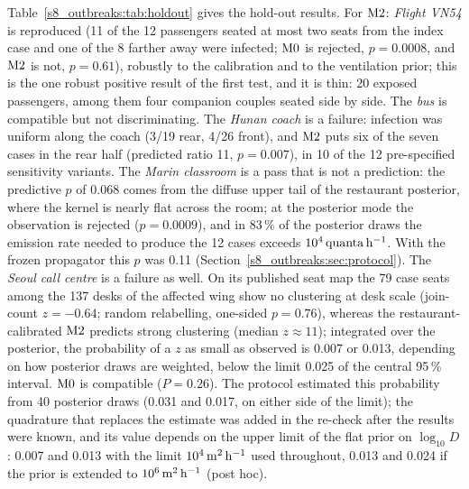 Table~\ref{s8_outbreaks:tab:holdout} gives the hold-out results. For $\mathrm{M2}$: \emph{Flight VN54} is reproduced
(11 of the 12 passengers seated at most two seats from the index case and one of the 8 farther away were
infected; $\mathrm{M0}$ is rejected, $p=0.0008$, and $\mathrm{M2}$ is not, $p=0.61$), robustly to the calibration and to the
ventilation prior; this is the one robust positive result of the first test, and it is thin: 20 exposed
passengers, among them four companion couples seated side by side. The \emph{bus} is compatible but not
discriminating. The \emph{Hunan coach} is a failure: infection was uniform along the coach (3/19 rear, 4/26
front), and $\mathrm{M2}$ puts six of the seven cases in the rear half (predicted ratio 11, $p=0.007$), in 10 of the 12
pre-specified sensitivity variants. The \emph{Marin classroom} is a pass that is not a prediction: the
predictive $p$ of 0.068 comes from the diffuse upper tail of the restaurant posterior, where the kernel is
nearly flat across the room; at the posterior mode the observation is rejected ($p=0.0009$), and in 83\,\% of
the posterior draws the emission rate needed to produce the 12 cases exceeds $10^{4}\,\mathrm{quanta}\,\mathrm{h}^{-1}$. With the frozen
propagator this $p$ was 0.11 (Section~\ref{s8_outbreaks:sec:protocol}).
The \emph{Seoul call centre} is a failure as well. On its published seat map the 79 case seats among the 137
desks of the affected wing show no clustering at desk scale (join-count $z=-0.64$; random relabelling, one-sided
$p=0.76$), whereas the restaurant-calibrated $\mathrm{M2}$ predicts strong clustering (median $z\approx11$); integrated
over the posterior, the probability of a $z$ as small as observed is 0.007 or 0.013, depending on how posterior
draws are weighted, below the limit 0.025 of the central 95\,\% interval. $\mathrm{M0}$ is compatible ($P=0.26$).
The protocol estimated this probability from 40 posterior draws (0.031 and 0.017, on either side of the limit);
the quadrature that replaces the estimate was added in the re-check after the results were known, and its value
depends on the upper limit of the flat prior on $\log_{10}D$: 0.007 and 0.013 with the limit $10^{4}\,\mathrm{m}^2\,\mathrm{h}^{-1}$ used
throughout, 0.013 and 0.024 if the prior is extended to $10^{6}\,\mathrm{m}^2\,\mathrm{h}^{-1}$ (post hoc).

